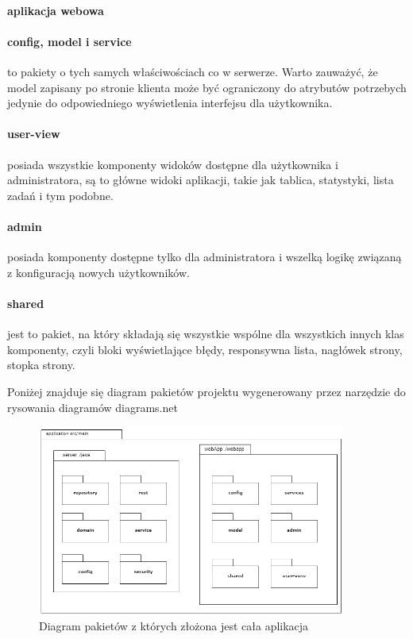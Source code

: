 \paragraph{aplikacja webowa}
\paragraph{config, model i service} to pakiety o tych samych właściwościach co w serwerze. Warto zauważyć, że model zapisany po stronie klienta może być ograniczony do atrybutów potrzebych jedynie do odpowiedniego wyświetlenia interfejsu dla użytkownika. 
\paragraph{user-view} posiada wszystkie komponenty widoków dostępne dla użytkownika i administratora, są to główne widoki aplikacji, takie jak tablica, statystyki, lista zadań i tym podobne.
\paragraph{admin} posiada komponenty dostępne tylko dla administratora i wszelką logikę związaną z konfiguracją nowych użytkowników.
\paragraph{shared} jest to pakiet, na który składają się wszystkie wspólne dla wszystkich innych klas komponenty, czyli bloki wyświetlające błędy, responsywna lista, nagłówek strony, stopka strony. 

 Poniżej znajduje się diagram pakietów projektu wygenerowany przez narzędzie do rysowania diagramów diagrams.net \cite{diagrams}
\begin{figure}[h]
	
	\centering
	\includegraphics[width=0.90\textwidth]{pakiety}		
	\caption{Diagram pakietów z których złożona jest cała aplikacja }
	\label{pakiet}
\end{figure}


